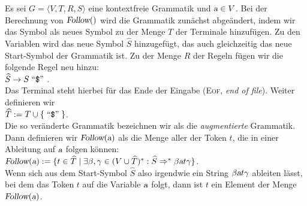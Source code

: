 \begin{Definition}
Es sei $G = \langle V, T, R, S \rangle$ eine kontextfreie Grammatik und $\textsl{a} \in V$.
Bei der Berechnung von $\textsl{Follow}()$ wird die Grammatik zun\"achst abge\"andert,
indem wir das Symbol  als neues Symbol zu der Menge $T$ der Terminale
hinzuf\"ugen.  Zu den Variablen wird das neue Symbol $\widehat{S}$ hinzugef\"ugt, das auch
gleichzeitig das neue Start-Symbol der Grammatik ist.  Zu der Menge $R$ der Regeln
f\"ugen wir die folgende Regel neu hinzu:
\\[0.2cm]
\hspace*{1.3cm}
$\widehat{S} \rightarrow S \quoted{\symbol{36}}$.
\\[0.2cm]
Das Terminal  steht hierbei f\"ur das Ende der Eingabe (\textsc{Eof},
\emph{end of file}).
Weiter definieren wir
\\[0.2cm]
\hspace*{1.3cm}
 $\widehat{T} := T \cup \{ \quoted{\symbol{36}} \}$.
\\[0.2cm]
Die so ver\"anderte Grammatik bezeichnen wir als die \emph{augmentierte} Grammatik.
Dann definieren wir $\textsl{Follow}(\textsl{a})$ als die Menge aller der Token $t$, die in einer
Ableitung auf $\textsl{a}$ folgen k\"onnen:
\\[0.2cm]
\hspace*{1.3cm}
$\textsl{Follow}(\textsl{a}) := 
 \{ t \in \widehat{T} \mid \exists \beta,\gamma \in (V \cup \widehat{T})^*: 
                           \widehat{S} \Rightarrow^* \beta \textsl{a} t \gamma 
  \}
$.
\\[0.2cm]
Wenn sich aus dem Start-Symbol $\widehat{S}$ also irgendwie ein String $\beta \textsl{a} t\gamma$ ableiten l\"asst,
bei dem das Token $t$ auf die Variable $\textsl{a}$ folgt, dann ist $t$ ein Element
der Menge $\textsl{Follow}(\textsl{a})$.
\eox
\end{Definition}

